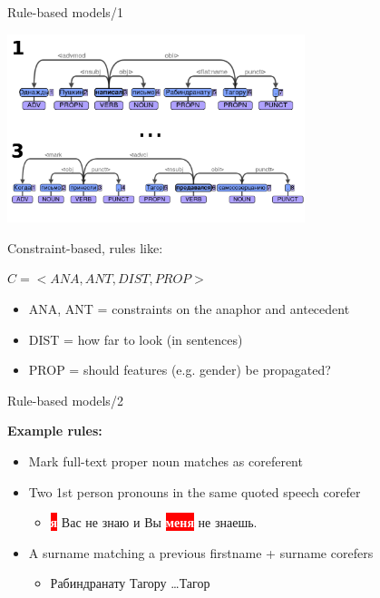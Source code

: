 \documentclass[dvipsnames, 10pt, compress]{beamer}
\newcommand{\redfillbox}[1]{\colorbox{red}{\textcolor{white}{{\bf #1}}}}
\begin{document}
\begin{frame}{Rule-based models/1} %

\begin{center}
\includegraphics[width=0.65\textwidth]{graphics/coref-dep-0.png}
\end{center}

Constraint-based, rules like:

$C = <ANA,  ANT, DIST, PROP>$

\begin{itemize}
  \item ANA, ANT = constraints on the anaphor and antecedent
  \item DIST = how far to look (in sentences)
  \item PROP = should features (e.g. gender) be propagated?
\end{itemize}

\end{frame}

\begin{frame}{Rule-based models/2} %

\textbf{Example rules:}

\begin{itemize}
  \item Mark full-text proper noun matches as coreferent
  \item Two 1st person pronouns in the same quoted speech corefer
  \begin{itemize}
    \item \redfillbox{я} Вас не знаю и Вы \redfillbox{меня} не знаешь.
  \end{itemize}  
  \item A surname matching a previous firstname + surname corefers
  \begin{itemize}
     \item Рабиндранату Тагору \ldots Тагор
  \end{itemize}
\end{itemize}

\end{frame}
\end{document}
